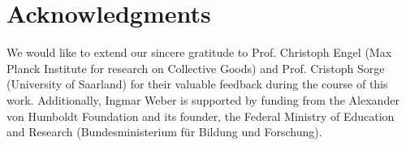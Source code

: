 \section*{Acknowledgments}
We would like to extend our sincere gratitude to Prof. Christoph Engel (Max Planck Institute for research on Collective Goods) and Prof. Cristoph Sorge (University of Saarland) for their valuable feedback during the course of this work. 
Additionally, Ingmar Weber is supported by funding from the Alexander von Humboldt Foundation and its founder, the Federal Ministry of Education and Research (Bundesministerium für Bildung und Forschung).
